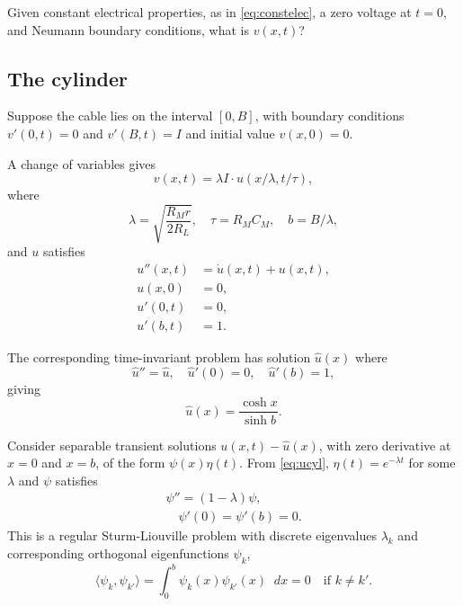 \documentclass[parskip=half]{scrartcl}
\newcommand{\Int}[2]{\int_{#1}^{#2}\!}
\newcommand{\D}{\mathop{}\!d}
\theoremstyle{nonumberplain}
\begin{document}
Given constant electrical properties, as in \eqref{eq:constelec},
a zero voltage at $t=0$, and Neumann boundary conditions, what
is $v(x, t)$?

\subsection{The cylinder}

Suppose the cable lies on the interval $[0, B]$, with boundary
conditions $v'(0, t) = 0$ and $v'(B, t) = I$ and initial value
$v(x, 0) = 0$.

A change of variables gives
\begin{equation}
    v(x, t) = \lambda I\cdot u(x/\lambda, t/\tau),
\end{equation}
where
\begin{equation}
    \lambda = \sqrt{\frac{R_M r}{2 R_L}}, \quad \tau = R_M C_M, \quad b = B/\lambda,
\end{equation}
and $u$ satisfies
\begin{equation}
    \begin{aligned}
	u''(x, t) &= \dot u(x, t) + u(x, t),\\
	u(x, 0) &= 0,\\
	u'(0, t) &= 0,\\
	u'(b, t) &= 1.
    \end{aligned}
    \label{eq:ucyl}
\end{equation}

The corresponding time-invariant problem has solution $\hat u(x)$ where
\begin{equation}
    \hat u'' = \hat u,\quad \hat u'(0) = 0,\quad \hat u'(b) = 1,
\end{equation}
giving
\begin{equation}
    \hat u(x) = \frac{\cosh x}{\sinh b}.
\end{equation}

Consider separable transient solutions $u(x,t)-\hat u(x)$, with zero derivative
at $x=0$ and $x=b$, of the form $\psi(x)\eta(t)$. From \eqref{eq:ucyl},
$\eta(t)=e^{-\lambda t}$ for some $\lambda$ and $\psi$ satisfies
\begin{gather}
    \label{eq:efncyl}
    \psi'' = (1-\lambda)\psi,\\
    \label{eq:efncylbc}
    \quad \psi'(0)=\psi'(b)=0.
\end{gather}
This is a regular Sturm-Liouville problem with discrete eigenvalues $\lambda_k$
and corresponding orthogonal eigenfunctions $\psi_k$,
\begin{equation}
    \langle \psi_k, \psi_{k'} \rangle =
    \Int{0}{b} \psi_k(x)\psi_{k'}(x) \D x =0\quad\text{if $k\neq k'$}.
\end{equation}
\end{document}
